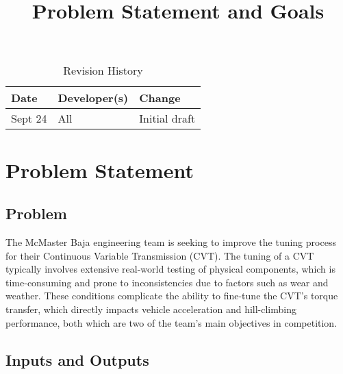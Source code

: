 \documentclass{article}
\title{Problem Statement and Goals\\\progname}
\author{\authname}
\date{}
\begin{document}
\maketitle

\begin{table}[hp]
\caption{Revision History} \label{TblRevisionHistory}
\begin{tabularx}{\textwidth}{llX}
\toprule
\textbf{Date} & \textbf{Developer(s)} & \textbf{Change}\\
\midrule
Sept 24 & All & Initial draft\\
\bottomrule
\end{tabularx}
\end{table}

\section{Problem Statement}

\subsection{Problem}
The McMaster Baja engineering team is seeking to improve the tuning process for their Continuous Variable Transmission (CVT). The tuning of a CVT typically involves extensive real-world testing of physical components, which is time-consuming and prone to inconsistencies due to factors such as wear and weather. These conditions complicate the ability to fine-tune the CVT’s torque transfer, which directly impacts vehicle acceleration and hill-climbing performance, both which are two of the team's main objectives in competition.


\subsection{Inputs and Outputs}
\end{document}
